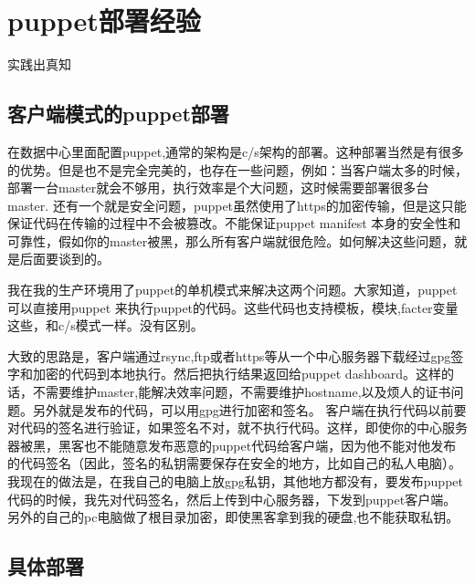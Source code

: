 \chapter{\msyh puppet部署经验}
\begin{center}
\kai
实践出真知
\end{center}

\section{\msyh 客户端模式的puppet部署}

在数据中心里面配置puppet,通常的架构是c/s架构的部署。这种部署当然是有很多的优势。但是也不是完全完美的，也存在一些问题，例如：当客户端太多的时候，部署一台master就会不够用，执行效率是个大问题，这时候需要部署很多台master. 还有一个就是安全问题，puppet虽然使用了https的加密传输，但是这只能保证代码在传输的过程中不会被篡改。不能保证puppet manifest 本身的安全性和可靠性，假如你的master被黑，那么所有客户端就很危险。如何解决这些问题，就是后面要谈到的。\par
我在我的生产环境用了puppet的单机模式来解决这两个问题。大家知道，puppet可以直接用puppet 来执行puppet的代码。这些代码也支持模板，模块,facter变量这些，和c/s模式一样。没有区别。\par
大致的思路是，客户端通过rsync,ftp或者https等从一个中心服务器下载经过gpg签字和加密的代码到本地执行。然后把执行结果返回给puppet dashboard。这样的话，不需要维护master,能解决效率问题，不需要维护hostname,以及烦人的证书问题。另外就是发布的代码，可以用gpg进行加密和签名。
客户端在执行代码以前要对代码的签名进行验证，如果签名不对，就不执行代码。这样，即使你的中心服务器被黑，黑客也不能随意发布恶意的puppet代码给客户端，因为他不能对他发布的代码签名（因此，签名的私钥需要保存在安全的地方，比如自己的私人电脑）。我现在的做法是，在我自己的电脑上放gpg私钥，其他地方都没有，要发布puppet代码的时候，我先对代码签名，然后上传到中心服务器，下发到puppet客户端。另外的自己的pc电脑做了根目录加密，即使黑客拿到我的硬盘,也不能获取私钥。\par
\section{\msyh 具体部署}

